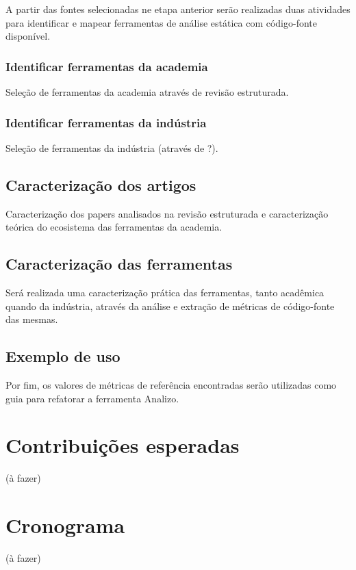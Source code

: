 \documentclass[12pt]{article}
\begin{document}
A partir das fontes selecionadas ne etapa anterior serão realizadas duas
atividades para identificar e mapear ferramentas de análise estática com
código-fonte disponível.

\subsubsection{Identificar ferramentas da academia}

Seleção de ferramentas da academia através de revisão estruturada.

\subsubsection{Identificar ferramentas da indústria}

Seleção de ferramentas da indústria (através de ?).

\subsection{Caracterização dos artigos}

Caracterização dos papers analisados na revisão estruturada e caracterização
teórica do ecosistema das ferramentas da academia.

\subsection{Caracterização das ferramentas}

Será realizada uma caracterização prática das ferramentas, tanto acadêmica
quando da indústria, através da análise e extração de métricas de código-fonte
das mesmas.


\subsection{Exemplo de uso}

Por fim, os valores de métricas de referência encontradas serão utilizadas
como guia para refatorar a ferramenta Analizo.

\section{Contribuições esperadas}

(à fazer)

\section{Cronograma}

(à fazer)

%
\end{document}
